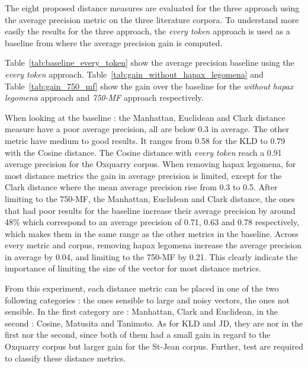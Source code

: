 The eight proposed distance measures are evaluated for the three approach using the average precision metric on the three literature corpora.
To understand more easily the results for the three approach, the \textit{every token} approach is used as a baseline from where the average precision gain is computed.

Table~\ref{tab:baseline_every_token} show the average precision baseline using the \textit{every token} approach.
Table~\ref{tab:gain_without_hapax_legomena} and Table~\ref{tab:gain_750_mf} show the gain over the baseline for the \textit{without hapax legomena} approach and \textit{750-MF} approach respectively.

When looking at the baseline : the Manhattan, Euclidean and Clark distance measure have a poor average precision, all are below 0.3 in average.
The other metric have medium to good results.
It ranges from 0.58 for the KLD to 0.79 with the Cosine distance.
The Cosine distance with \textit{every token} reach a 0.91 average precision for the Oxquarry corpus.
When removing hapax legomena, for most distance metrics the gain in average precision is limited, except for the Clark distance where the mean average precision rise from 0.3 to 0.5.
After limiting to the 750-MF, the Manhattan, Euclidean and Clark distance, the ones that had poor results for the baseline increase their average precision by around 48\% which correspond to an average precision of 0.71, 0.63 and 0.78 respectively, which makes them in the same range as the other metrics in the baseline.
Across every metric and corpus, removing hapax legomena increase the average precision in average by 0.04, and limiting to the 750-MF by 0.21.
This clearly indicate the importance of limiting the size of the vector for most distance metrics.

From this experiment, each distance metric can be placed in one of the two following categories : the ones sensible to large and noisy vectors, the ones not sensible.
In the first category are : Manhattan, Clark and Euclidean, in the second : Cosine, Matusita and Tanimoto.
As for KLD and JD, they are nor in the first nor the second, since both of them had a small gain in regard to the Oxquarry corpus but larger gain for the St-Jean corpus.
Further, test are required to classify these distance metrics.

